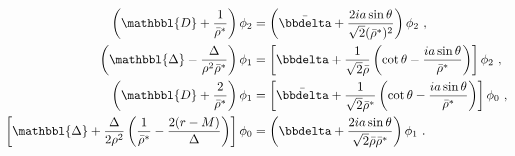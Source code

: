 \begin{subequations}
    \begin{align}
        \label{eq3:phi21phi14Expand}
        \left( \mathbbl{D} + \frac{1}{\bar{\rho}^*} \right) \phi_2 &= 
        \left( \bar{\bbdelta} + \frac{2 i a \sin\theta}{\sqrt{2} (\bar{\rho}^*)^2} \right) \phi_2 ~,\\
        \label{eq3:phi12phi23Expand}
        \left( \mathbbl{\Delta} - \frac{\Delta}{\rho^2 \bar{\rho}^*} \right) \phi_1 &= 
        \left[ \bbdelta + \frac{1}{\sqrt{2} \bar{\rho}} \left( \cot\theta - \frac{i a \sin\theta}{\bar{\rho}^*} \right) \right] \phi_2 ~,\\
        \label{eq3:phi11phi04Expand}
        \left( \mathbbl{D} + \frac{2}{\bar{\rho}^*} \right) \phi_1 &=
        \left[ \bar{\bbdelta} + \frac{1}{\sqrt{2} \bar{\rho}^*}\left( \cot\theta - \frac{i a \sin\theta}{\bar{\rho}^*} \right) \right] \phi_0 ~, \\
        \label{eq3:phi02phi13Expand}
        \left[ \mathbbl{\Delta} + \frac{\Delta}{2 \rho^2} \left( \frac{1}{\bar{\rho}^*} - \frac{2(r-M)}{\Delta} \right) \right] \phi_0 &=
        \left(\bbdelta + \frac{2 i a \sin\theta}{\sqrt{2} \bar{\rho} \bar{\rho}^*}\right) \phi_1  ~.
    \end{align}
    \label{eq3:phiAllExpand}
\end{subequations}

